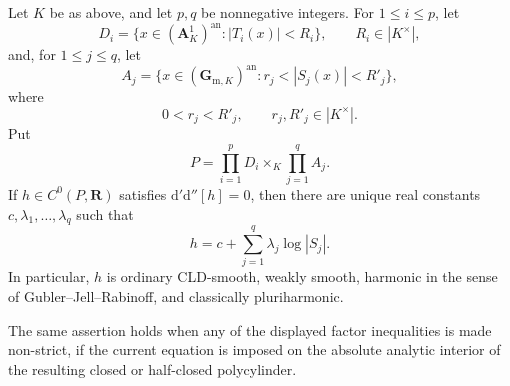 \begin{theorem}\label{thm:p062-arbitrary-field-polycylinder-candidate}
Let \(K\) be as above, and let \(p,q\) be nonnegative integers. For
\(1\leq i\leq p\), let
\[
 D_i=\{x\in(\mathbf A^1_K)^{\mathrm{an}}:|T_i(x)|<R_i\},
 \qquad R_i\in|K^\times|,
\]
and, for \(1\leq j\leq q\), let
\[
 A_j=\{x\in(\mathbf G_{\mathrm m,K})^{\mathrm{an}}:
                  r_j<|S_j(x)|<R'_j\},
\]
where
\[
                  0<r_j<R'_j,
 \qquad r_j,R'_j\in|K^\times|.
\]
Put
\[
                         P=\prod_{i=1}^pD_i\times_K
                           \prod_{j=1}^qA_j.
\]
If \(h\in C^0(P,\mathbf R)\) satisfies
\(
 \mathrm d'\mathrm d''[h]=0
\), then there are unique real constants
\(c,\lambda_1,\ldots,\lambda_q\) such that
\begin{equation}\label{eq:p062-polycylinder-affine-candidate}
                   h=c+\sum_{j=1}^q\lambda_j\log|S_j|.
\end{equation}
In particular, \(h\) is ordinary CLD-smooth, weakly smooth, harmonic in
the sense of Gubler--Jell--Rabinoff, and classically pluriharmonic.

The same assertion holds when any of the displayed factor inequalities
is made non-strict, if the current equation is imposed on the absolute
analytic interior of the resulting closed or half-closed polycylinder.
\end{theorem}
